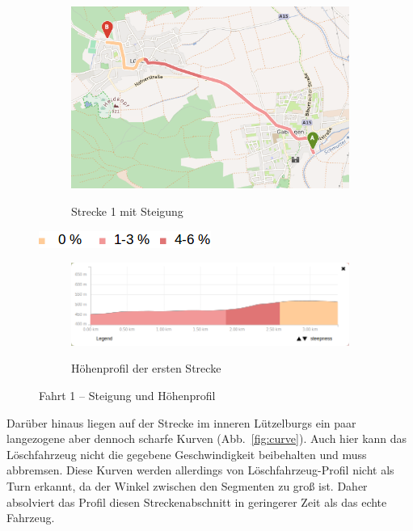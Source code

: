 \begin{figure}[htb]
\centering
\begin{subfigure}{0.80\textwidth}
\centering
\includegraphics[width = \textwidth]{../media/Fahrt1_Steep.png} \\
\caption{Strecke 1 mit Steigung}
\label{fig:steig}
\end{subfigure}

\includegraphics[width =0.25 \textwidth]{../media/legend2.png} \\

\begin{subfigure}{ \textwidth}
\centering
\includegraphics[width = \textwidth]{../media/Fahrt1_Profile.png} \\
\caption{Höhenprofil der ersten Strecke}
\label{profile}
\end{subfigure}
\caption{Fahrt 1 -- Steigung und Höhenprofil}
\label{steig}
\end{figure}

Darüber hinaus liegen auf der Strecke im inneren Lützelburgs ein paar langezogene aber dennoch scharfe Kurven (Abb.~\ref{fig:curve}).
Auch hier kann das Löschfahrzeug nicht die gegebene Geschwindigkeit beibehalten und muss abbremsen.
Diese Kurven werden allerdings von Löschfahrzeug-Profil nicht als Turn erkannt, da der Winkel zwischen den Segmenten zu groß ist.
Daher absolviert das Profil diesen Streckenabschnitt in geringerer Zeit als das echte Fahrzeug.

